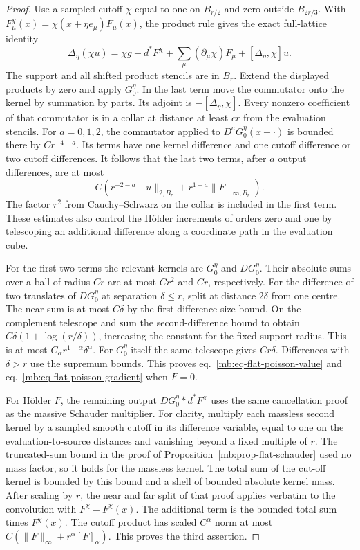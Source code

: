 \documentclass[11pt,letterpaper,reqno]{amsart}
\numberwithin{equation}{section}
\renewcommand{\eqref}[1]{\textup{eq.~\ref{#1}}}
\theoremstyle{definition}
\theoremstyle{remark}
\begin{document}
\begin{proof}
Use a sampled cutoff \(\chi\) equal to one on \(B_{r/2}\) and
zero outside \(B_{2r/3}\). With \(F_\mu^\chi(x)=
\chi(x+\eta e_\mu)F_\mu(x)\), the product rule gives the exact
full-lattice identity
\[
 \Delta_\eta(\chi u)
   =\chi g+d^*F^\chi
        +\sum_\mu (\partial_\mu\chi)F_\mu+[\Delta_\eta,\chi]u .
\]
The support and all shifted product stencils are in \(B_r\).
Extend the displayed products by zero and apply \(G_0^\eta\).
In the last term move the commutator onto the kernel by
summation by parts. Its adjoint is \(-[\Delta_\eta,\chi]\).
Every nonzero coefficient of that commutator is in a collar
at distance at least \(cr\) from the evaluation stencils.
For \(a=0,1,2\), the commutator applied to \(D^aG_0^\eta(x-\cdot)\)
is bounded there by \(Cr^{-4-a}\). Its terms have one kernel
difference and one cutoff difference or two cutoff differences.
It follows that the last two terms, after \(a\) output differences,
are at most
\[
 C(r^{-2-a}\|u\|_{2,B_r}+r^{1-a}\|F\|_{\infty,B_r}).
\]
The factor \(r^2\) from Cauchy--Schwarz on the collar is included
in the first term. These estimates also control the Hölder
increments of orders zero and one by telescoping an additional
difference along a coordinate path in the evaluation cube.

For the first two terms the relevant kernels are \(G_0^\eta\)
and \(DG_0^\eta\). Their absolute sums over a ball of radius
\(Cr\) are at most \(Cr^2\) and \(Cr\), respectively.
For the difference of two translates of \(DG_0^\eta\) at
separation \(\delta\le r\), split at distance \(2\delta\)
from one centre. The near sum is at most \(C\delta\) by
the first-difference size bound. On the complement telescope
and sum the second-difference bound to obtain
\(C\delta(1+\log(r/\delta))\), increasing the constant for
the fixed support radius. This is at most
\(C_\alpha r^{1-\alpha}\delta^\alpha\). For \(G_0^\eta\)
itself the same telescope gives \(Cr\delta\). Differences
with \(\delta>r\) use the supremum bounds. This proves
\eqref{mb:eq-flat-poisson-value} and
\eqref{mb:eq-flat-poisson-gradient} when \(F=0\).

For H\"older \(F\), the remaining output \(DG_0^\eta*d^*F^\chi\)
uses the same cancellation proof as the massive Schauder
multiplier. For clarity, multiply each massless second kernel
by a sampled smooth cutoff in its difference variable, equal
to one on the evaluation-to-source distances and vanishing
beyond a fixed multiple of \(r\). The truncated-sum bound in
the proof of Proposition~\ref{mb:prop-flat-schauder} used no
mass factor, so it holds for the massless kernel. The total
sum of the cut-off kernel is bounded by this bound and a shell
of bounded absolute kernel mass. After scaling by \(r\), the
near and far split of that proof applies verbatim to the
convolution with \(F^\chi-F^\chi(x)\). The additional term is
the bounded total sum times \(F^\chi(x)\). The cutoff product
has scaled \(C^\alpha\) norm at most
\(C(\|F\|_\infty+r^\alpha[F]_\alpha)\).
This proves the third assertion.
\end{proof}
\end{document}
